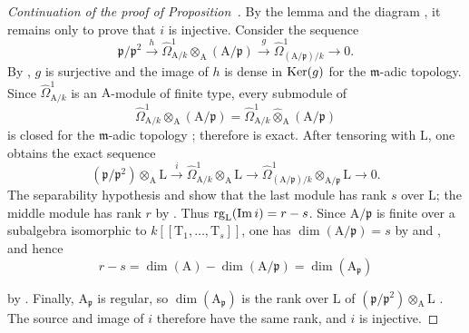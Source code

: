 \begin{proof}[Continuation of the proof of Proposition~{\rm{}}]
By the lemma and the diagram , it remains only to prove that $i$ is injective.
Consider the sequence
\begin{equation}
\label{0.22.7.2.6}
  \mathfrak{p}/\mathfrak{p}^2\xrightarrow{h}
  \widehat{\Omega}^1_{\mathrm{A}/k}\widehat{\otimes}_\mathrm{A}(\mathrm{A}/\mathfrak{p})
  \xrightarrow{g}\widehat{\Omega}^1_{(\mathrm{A}/\mathfrak{p})/k}\to 0.
  \tag{22.7.2.6}
\end{equation}
By , $g$ is surjective and the image of $h$ is dense in $\operatorname{Ker}(g)$ for the $\mathfrak{m}$-adic topology.
Since $\widehat{\Omega}^1_{\mathrm{A}/k}$ is an $\mathrm{A}$-module of finite type, every submodule of
\[
  \widehat{\Omega}^1_{\mathrm{A}/k}\otimes_\mathrm{A}(\mathrm{A}/\mathfrak{p})
  =\widehat{\Omega}^1_{\mathrm{A}/k}\widehat{\otimes}_\mathrm{A}(\mathrm{A}/\mathfrak{p})
\]
is closed for the $\mathfrak{m}$-adic topology ; therefore  is exact.
After tensoring with $\mathrm{L}$, one obtains the exact sequence
\[
  (\mathfrak{p}/\mathfrak{p}^2)\otimes_\mathrm{A}\mathrm{L}\xrightarrow{i}
  \widehat{\Omega}^1_{\mathrm{A}/k}\otimes_\mathrm{A}\mathrm{L}\to
  \widehat{\Omega}^1_{(\mathrm{A}/\mathfrak{p})/k}\otimes_{\mathrm{A}/\mathfrak{p}}\mathrm{L}\to 0.
\]
The separability hypothesis and  show that the last module has rank $s$ over $\mathrm{L}$; the middle module has rank $r$ by .
Thus $\operatorname{rg}_\mathrm{L}(\operatorname{Im}i)=r-s$.
Since $\mathrm{A}/\mathfrak{p}$ is finite over a subalgebra isomorphic to $k[[\mathrm{T}_1,\ldots,\mathrm{T}_s]]$, one has $\dim(\mathrm{A}/\mathfrak{p})=s$ by  and , and hence
\[
  r-s=\dim(\mathrm{A})-\dim(\mathrm{A}/\mathfrak{p})=\dim(\mathrm{A}_\mathfrak{p})
\]


by .
Finally, $\mathrm{A}_\mathfrak{p}$ is regular, so $\dim(\mathrm{A}_\mathfrak{p})$ is the rank over $\mathrm{L}$ of
$(\mathfrak{p}/\mathfrak{p}^2)\otimes_\mathrm{A}\mathrm{L}$ .
The source and image of $i$ therefore have the same rank, and $i$ is injective.
\end{proof}

